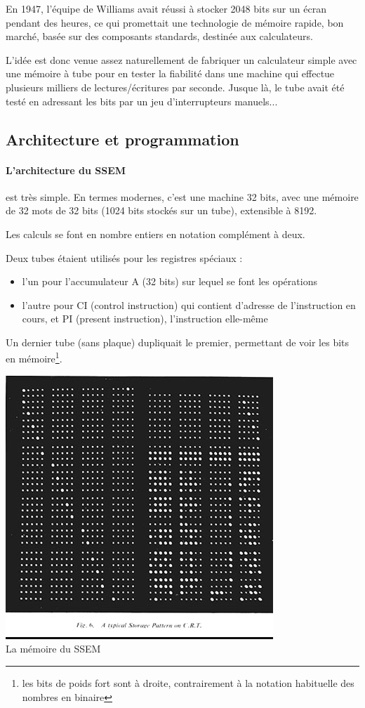 \begin{multicols}{2}
En 1947, l'équipe de Williams avait réussi à stocker 2048 bits sur un
écran pendant des heures, ce qui promettait une technologie de mémoire
rapide, bon marché, basée sur des composants standards, destinée aux calculateurs. 

L'idée est donc venue assez naturellement de fabriquer un calculateur
simple avec une mémoire à tube pour en tester la fiabilité dans une
machine qui effectue plusieurs milliers de lectures/écritures par
seconde. Jusque là, le tube avait été testé en adressant les bits par
un jeu d'interrupteurs manuels...

\subsection{Architecture et programmation}

\paragraph{L'architecture du SSEM} est très simple. En termes modernes,
c'est une machine 32 bits, avec une mémoire de 32 mots de 32 bits
(1024 bits stockés sur un tube), extensible à 8192. 

Les calculs se
font en nombre entiers en notation complément à deux.

Deux tubes étaient utilisés pour les registres spéciaux :
\begin{itemize}
\item l'un pour l'accumulateur A (32 bits) 
sur lequel se font les opérations
\item l'autre pour CI (control instruction) qui contient d'adresse de
  l'instruction en cours, et PI (present instruction), l'instruction
  elle-même
\end{itemize}
Un dernier tube (sans plaque) dupliquait le premier, permettant de
voir les bits en mémoire\footnote{les bits de poids fort sont à droite, contrairement à la notation habituelle des nombres en binaire}.

\begin{center}
\includegraphics[width=0.6\linewidth]{Historique/crt.jpg}
\\
La mémoire du SSEM
\end{center}


\end{multicols}
